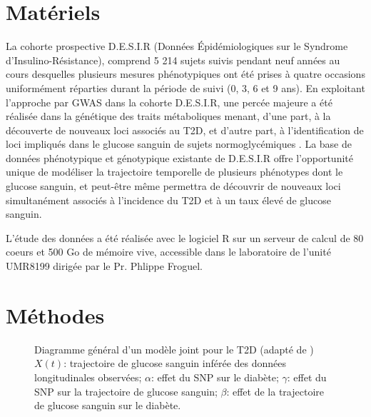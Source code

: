 \documentclass[11pt, a4paper]{article}
\begin{document}
\section{Matériels}
\par{La cohorte prospective D.E.S.I.R (Données Épidémiologiques sur le Syndrome d’Insulino-Résistance),
comprend 5 214 sujets suivis pendant neuf années au cours desquelles plusieurs mesures
phénotypiques ont été prises à quatre occasions uniformément réparties durant la période de suivi (0, 3, 6 et 9 ans).
En exploitant l’approche par GWAS dans la cohorte D.E.S.I.R, une percée majeure a été réalisée dans la génétique
des traits métaboliques menant, d’une part, à la découverte de nouveaux loci associés au T2D, et d’autre part,
à l’identification de loci impliqués dans le glucose sanguin de sujets normoglycémiques \citep{dupuis_new_2010, voight_twelve_2010}.
La base de données phénotypique et génotypique existante de D.E.S.I.R offre l’opportunité unique de modéliser
la trajectoire temporelle de plusieurs phénotypes dont le glucose sanguin, et peut-être même permettra
de découvrir de nouveaux loci simultanément associés à l’incidence du T2D et à un taux élevé de glucose sanguin.}
\par{L’étude des données a été réalisée avec le logiciel R sur un serveur de calcul de 80 coeurs
et 500 Go de mémoire vive, accessible dans le laboratoire de l'unité UMR8199 dirigée par le Pr. Phlippe Froguel.}


\section{Méthodes\label{sec:Methods}}
\begin{figure}[ht]
    \begin{center}
    \end{center}
    \vspace{-15pt}
    \caption{Diagramme général d'un modèle joint pour le T2D (adapté de \cite{ibrahim_basic_2010})\newline
    {\small $X(t)$: trajectoire de glucose sanguin inférée des données longitudinales observées;
    $\alpha$: effet du SNP sur le diabète;
    $\gamma$: effet du SNP sur la trajectoire de glucose sanguin;
    $\beta$: effet de la trajectoire de glucose sanguin sur le diabète.}}
    \label{fig:JointModel}
\end{figure}
\end{document}
